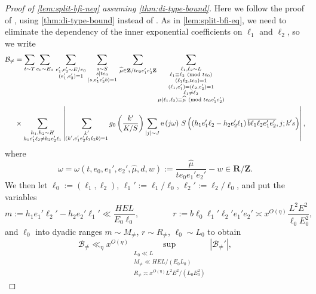 \documentclass[reqno,11pt]{amsart}
\theoremstyle{definition}
\theoremstyle{remark}
\numberwithin{equation}{section}
\newcommand{\Z}{\mathbf{Z}}
\newcommand{\R}{\mathbf{R}}
\newcommand{\mB}{\mathcal{B}}
\newcommand{\e}{\textnormal{e}}
\renewcommand{\bar}{\overline}
\renewcommand{\hat}{\widehat}
\renewcommand{\pmod}[1]{\ (\textnormal{mod } #1)}
\begin{document}
\begin{proof}[Proof of \cref{lem:split-bfi-neq} assuming \cref{thm:di-type-bound}]
Here we follow the proof of \cite[Lemma 18.6]{maynard2020primes}, using \cref{thm:di-type-bound} instead of \cite[Theorem 9]{deshouillers1982kloosterman}. As in \cref{lem:split-bfi-eq}, we need to eliminate the dependency of the inner exponential coefficients on $\ell_1$ and $\ell_2$, so we write
\[
\begin{aligned}
    \mB_{\neq} 
    &= 
    \sum_{t \sim T} \sum_{e_0 \sim E_0}\,
    \sum_{\substack{e_1', e_2' \sim E/e_0 \\ (e_1', e_2') = 1}}
    \sum_{\substack{s \sim S \\ s \mid te_0 \\ (s, e_1'e_2'b) = 1}}\,
    \sum_{\hat{\mu} \in \Z/te_0e_1'e_2'\Z}
    \sum_{\substack{\ell_1, \ell_2 \sim L \\ \ell_1 \equiv \ell_2 \pmod{te_0} \\ (\ell_1 \ell_2, te_0) = 1 \\ (\ell_1, e_1') = (\ell_2, e_2') = 1 \\ \ell_1 \neq \ell_2 \\ \mu(\ell_1, \ell_2) \equiv \hat{\mu} \pmod{te_0e_1'e_2'}}} 
    \\
    &\times 
    \sum_{\substack{h_1, h_2 \sim H \\ h_1e_1'\ell_2 \neq h_2e_2'\ell_1}}
    \left\vert 
    \sum_{\substack{k' \\ (k', e_1'e_2'\ell_1\ell_2b) = 1}} g_0 \left(\frac{k'}{K/S}\right)
    \sum_{|j| \sim J} \e\left(j \omega\right)\, 
    S\left( (h_1e_1'\ell_2 - h_2e_2'\ell_1)\, \bar{b \ell_1 \ell_2 e_1' e_2'}, j; k's\right)
    \right\vert,
\end{aligned}
\]
where
\[
    \omega = \omega(t, e_0, e_1', e_2', \hat{\mu}, d, w) := \frac{\hat{\mu}}{te_0e_1'e_2'} - w \in \R/\Z.
\]
We then let $\ell_0 := (\ell_1, \ell_2)$, $\ell_1' := \ell_1/\ell_0$, $\ell_2' := \ell_2/\ell_0$, and put the variables
\[
    m := h_1e_1'\ell_2' - h_2e_2'\ell_1' \ll \frac{HEL}{E_0 \ell_0}, \qquad\qquad
    r := b \ell_0 \ell_1' \ell_2' e_1' e_2' \asymp x^{O(\eta)} \frac{L^2 E^2}{\ell_0 E_0^2},
\]
and $\ell_0$ into dyadic ranges $m \sim M_{\neq}$, $r \sim R_{\neq}$, $\ell_0 \sim L_0$ to obtain 
\begin{equation} \label{eq:bneq-bound}
    \mB_{\neq} \ll_\eta x^{O(\eta)} \sup_{\substack{L_0 \ll L \\ M_{\neq} \ll HEL/(E_0L_0) \\ R_{\neq} \asymp x^{O(\eta)} L^2E^2/(L_0E_0^2)}} |\mB_{\neq}'|,

\end{equation}
\end{proof}
\end{document}
